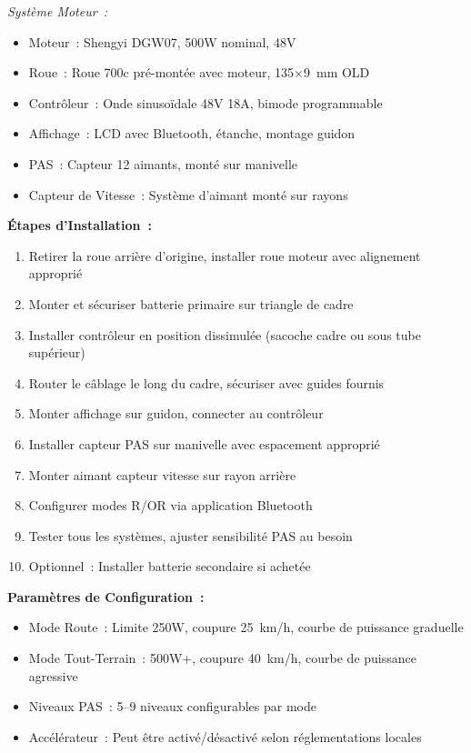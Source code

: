 \documentclass[12pt,a4paper]{article}
\begin{document}
\textit{Système Moteur~:}
\begin{itemize}
    \item Moteur~: Shengyi DGW07, 500W nominal, 48V
    \item Roue~: Roue 700c pré-montée avec moteur, 135×9~mm OLD
    \item Contrôleur~: Onde sinusoïdale 48V 18A, bimode programmable
    \item Affichage~: LCD avec Bluetooth, étanche, montage guidon
    \item PAS~: Capteur 12 aimants, monté sur manivelle
    \item Capteur de Vitesse~: Système d'aimant monté sur rayons
\end{itemize}

\textbf{Étapes d'Installation~:}
\begin{enumerate}
    \item Retirer la roue arrière d'origine, installer roue moteur avec alignement approprié
    \item Monter et sécuriser batterie primaire sur triangle de cadre
    \item Installer contrôleur en position dissimulée (sacoche cadre ou sous tube supérieur)
    \item Router le câblage le long du cadre, sécuriser avec guides fournis
    \item Monter affichage sur guidon, connecter au contrôleur
    \item Installer capteur PAS sur manivelle avec espacement approprié
    \item Monter aimant capteur vitesse sur rayon arrière
    \item Configurer modes R/OR via application Bluetooth
    \item Tester tous les systèmes, ajuster sensibilité PAS au besoin
    \item Optionnel~: Installer batterie secondaire si achetée
\end{enumerate}

\textbf{Paramètres de Configuration~:}
\begin{itemize}
    \item Mode Route~: Limite 250W, coupure 25~km/h, courbe de puissance graduelle
    \item Mode Tout-Terrain~: 500W+, coupure 40~km/h, courbe de puissance agressive
    \item Niveaux PAS~: 5--9 niveaux configurables par mode
    \item Accélérateur~: Peut être activé/désactivé selon réglementations locales
\end{itemize}
\end{document}
